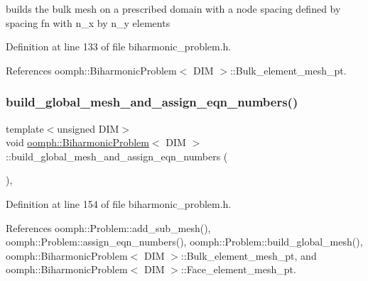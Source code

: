 builds the bulk mesh on a prescribed domain with a node spacing defined by spacing fn with n\+\_\+x by n\+\_\+y elements 



Definition at line 133 of file biharmonic\+\_\+problem.\+h.



References oomph\+::\+Biharmonic\+Problem$<$ D\+I\+M $>$\+::\+Bulk\+\_\+element\+\_\+mesh\+\_\+pt.

\mbox{\label{classoomph_1_1BiharmonicProblem_a2ed9f3c94a3609638042089251476bcf}} 
\subsubsection{\texorpdfstring{build\+\_\+global\+\_\+mesh\+\_\+and\+\_\+assign\+\_\+eqn\+\_\+numbers()}{build\_global\_mesh\_and\_assign\_eqn\_numbers()}}
{\footnotesize\ttfamily template$<$unsigned D\+IM$>$ \\
void \hyperlink{classoomph_1_1BiharmonicProblem}{oomph\+::\+Biharmonic\+Problem}$<$ D\+IM $>$\+::build\+\_\+global\+\_\+mesh\+\_\+and\+\_\+assign\+\_\+eqn\+\_\+numbers (\begin{DoxyParamCaption}{ }\end{DoxyParamCaption})\hspace{0.3cm}{\ttfamily [inline]}, {\ttfamily [protected]}}



Definition at line 154 of file biharmonic\+\_\+problem.\+h.



References oomph\+::\+Problem\+::add\+\_\+sub\+\_\+mesh(), oomph\+::\+Problem\+::assign\+\_\+eqn\+\_\+numbers(), oomph\+::\+Problem\+::build\+\_\+global\+\_\+mesh(), oomph\+::\+Biharmonic\+Problem$<$ D\+I\+M $>$\+::\+Bulk\+\_\+element\+\_\+mesh\+\_\+pt, and oomph\+::\+Biharmonic\+Problem$<$ D\+I\+M $>$\+::\+Face\+\_\+element\+\_\+mesh\+\_\+pt.

\mbox{\label{classoomph_1_1BiharmonicProblem_a3ead105fc8c4ebc9c9ba6ca443f4f0fd}} 

